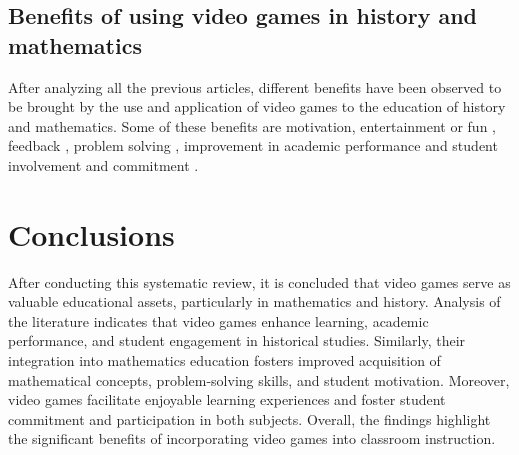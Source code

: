 \documentclass[english]{textolivre}
\begin{document}
\subsection{Benefits of using video games in history and mathematics}
After analyzing all the previous articles, different benefits have been observed to be brought by the use and application of video games to the education of history and mathematics. Some of these benefits are motivation, entertainment or fun \cite{alzahrani_evaluation_2013,cornella_canals_design_2013,drigas_line_2015,saez-lopez_exploring_2015,mangowal_mathbharata:_2017,Li_2018,nunes_liber_2022,pradiante_contribution_2022}, feedback \cite{yong_let_2021}, problem solving \cite{drigas_line_2015,albarracin_taller_2019,holguin-alvarez_gamificacion_2019,albarracin_secuencia_2021}, improvement in academic performance \cite{graziano_enhanced_1999,kebritchi_effects_2010,sar_role_2012,cornella_canals_design_2013,chen_design_2014,deater-deckard_student_2014,goldin_far_2014,yu_exploration_2014,drigas_line_2015,saez-lopez_exploring_2015,evaristo_chiyong_uso_2016,hieftje_evaluation_2017,hussain_digital_2017,kert_comparing_2017,barrios_matelogic:_2018,del_moral_perez_game-based_2018,fokides_digital_2018,albarracin_taller_2019,bokolas_between_2019,holguin-alvarez_gamificacion_2019,pires_building_2019,baig_effect_2020,Rea-Penafiel_2020,albarracin_secuencia_2021,fraga-varela_impact_2021,jaldon-mendez_sanchez_uso_2021,yong_let_2021,ester_aprender_2022,holguin-alvarez_gamificacion_2022,holguin-alvarez_modificacion_2022,karki_improving_2022,walkington_effect_2022} and student involvement and commitment \cite{watson_case_2011,deater-deckard_student_2014,yu_exploration_2014,martinez_soto_evaluacion_2018,bokolas_between_2019,gali_visiting_2019,Rea-Penafiel_2020,jaldon-mendez_sanchez_uso_2021,ruth_commercial_2021,wisittanawat_tricky_2021,hanghoj_digital_2022,pradiante_contribution_2022}.


\section{Conclusions}\label{sec-formato}
After conducting this systematic review, it is concluded that video games serve as valuable educational assets, particularly in mathematics and history. Analysis of the literature indicates that video games enhance learning, academic performance, and student engagement in historical studies. Similarly, their integration into mathematics education fosters improved acquisition of mathematical concepts, problem-solving skills, and student motivation. Moreover, video games facilitate enjoyable learning experiences and foster student commitment and participation in both subjects. Overall, the findings highlight the significant benefits of incorporating video games into classroom instruction.
\end{document}
